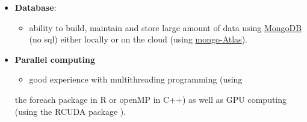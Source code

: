 \documentclass[a4paper,twoside,11pt]{article}
\begin{document}
\begin{itemize}
\item \textbf{Database}:
\begin{itemize}
\item ability to build, maintain and store large amount of data using \href{https://www.mongodb.com/}{MongoDB} (no
sql) either locally or on the cloud (using \href{https://www.mongodb.com/cloud/atlas}{mongo-Atlas}).
\end{itemize}

\item \textbf{Parallel computing} 
\begin{itemize}
\item good experience with multithreading programming (using
\end{itemize}
the foreach package \citep{analytics2014doparallel} in R or openMP
\citep{dagum1998openmp} in C++) as well as GPU computing (using the RCUDA
package \citep{baines2014rcuda}).
\end{itemize}

\label{sec:orga89f5a4}


\end{document}
